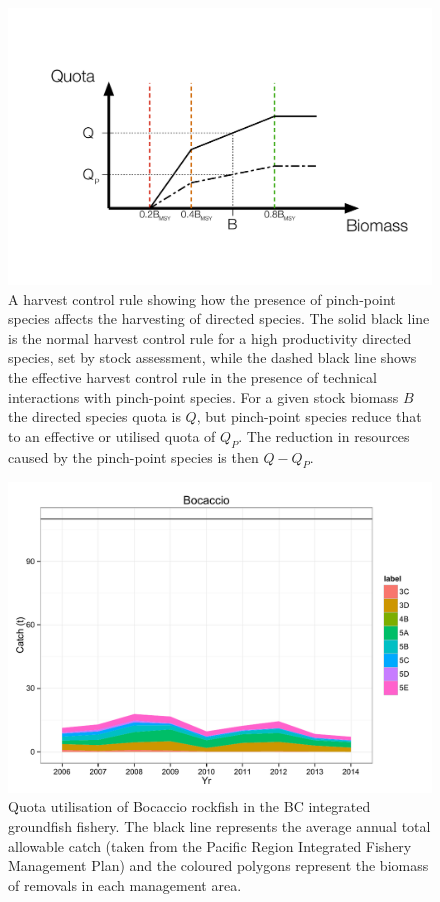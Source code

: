 \documentclass[]{scrartcl}
\begin{document}
\newpage

\begin{figure}[htbp]
\centering
\includegraphics{figures/ppHCR.pdf}
\caption{A harvest control rule showing how the presence of pinch-point species affects the harvesting of directed species. The solid black line is the normal harvest control rule for a high productivity directed species, set by stock assessment, while the dashed black line shows the effective harvest control rule in the presence of technical interactions with pinch-point species. For a given stock biomass $B$ the directed species quota is $Q$, but pinch-point species reduce that to an effective or utilised quota of $Q_P$. The reduction in resources caused by the pinch-point species is then $Q - Q_P$.}\label{fig:ppHCR}
\end{figure}

\newpage

\begin{figure}[htbp]
\centering
\includegraphics{figures/bocaccio.pdf}
\caption{Quota utilisation of Bocaccio rockfish in the BC integrated groundfish fishery. The black line represents the average annual total allowable catch (taken from the Pacific Region Integrated Fishery Management Plan) and the coloured polygons represent the biomass of removals in each management area.}\label{fig:bocaccio}
\end{figure}
\end{document}
